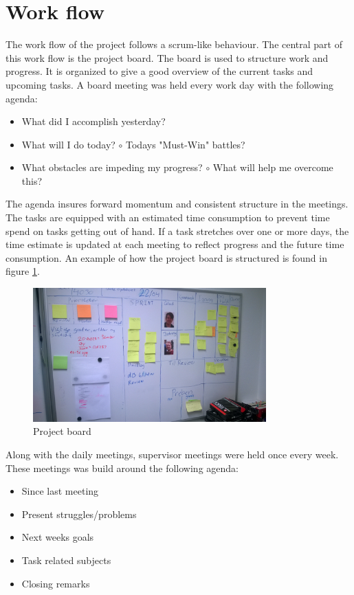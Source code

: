 \section{Work flow}
The work flow of the project follows a scrum-like behaviour. The central part of this  work flow is the project board. The board is used to structure work and progress. It is organized to give a good overview of the current tasks and upcoming tasks. A board meeting was held every work day with the following agenda:
\begin{itemize}
	\item What did I accomplish yesterday?
	\item What will I do today?
	\subitem $\circ$ Todays "Must-Win" battles?
	\item What obstacles are impeding my progress?
	\subitem $\circ$ What will help me overcome this?
\end{itemize}
The agenda insures forward momentum and consistent structure in the meetings.\\
The tasks are equipped with an estimated time consumption to prevent time spend on tasks getting out of hand. If a task stretches over one or more days, the time estimate is updated at each meeting to reflect progress and the future time consumption. An example of how the project board is structured is found in figure \ref{fig:prjboard}.

\begin{figure}[hbpt]
	\centering
	\includegraphics[width=0.8\textwidth]{billeder/9projectexecution/board}
	\caption{Project board}
	\label{fig:prjboard}
\end{figure}

Along with the daily meetings, supervisor meetings were held once every week. These meetings was build around the following agenda:
\begin{itemize}
	\item Since last meeting
	\item Present struggles/problems
	\item Next weeks goals
	\item Task related subjects
	\item Closing remarks
\end{itemize}

